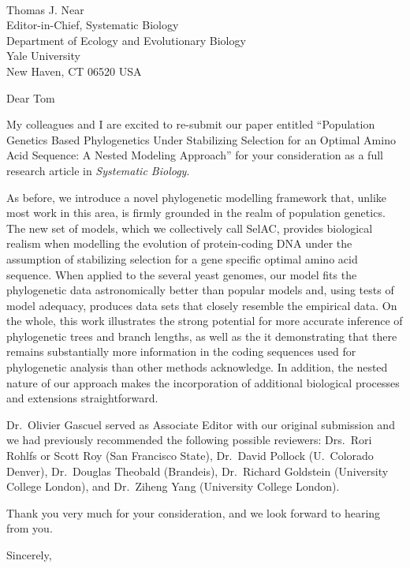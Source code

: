 \documentclass[11pt,letterpaper]{letter}
\begin{document}
\begin{letter}{
\ \\
Thomas J. Near\\
Editor-in-Chief, Systematic Biology\\
Department of Ecology and Evolutionary Biology\\
Yale University\\
New Haven, CT 06520 USA
}


\opening{Dear Tom}

My colleagues and I are excited to re-submit our paper entitled “Population Genetics Based Phylogenetics Under Stabilizing Selection for an Optimal Amino Acid Sequence: A Nested Modeling Approach” for your consideration as a full research article in \emph{Systematic Biology}.

As before, we introduce a novel phylogenetic modelling framework that, unlike most work in this area, is firmly grounded in the realm of population genetics. 
The new set of models, which we collectively call SelAC, provides biological realism when modelling the evolution of protein-coding DNA under the assumption of stabilizing selection for a gene specific optimal amino acid sequence. 
When applied to the several yeast genomes, our model fits the phylogenetic data astronomically better than popular models and, using tests of model adequacy,  produces data sets that closely resemble the empirical data. 
On the whole, this work illustrates the strong potential for more accurate inference of phylogenetic trees and branch lengths, as well as the it demonstrating that there remains substantially more information in the coding sequences used for phylogenetic analysis than other methods acknowledge.
In addition, the nested nature of our approach makes the incorporation of additional biological processes and extensions straightforward. 

Dr.~Olivier Gascuel served as Associate Editor with our original submission and we had previously recommended the following possible reviewers: Drs.~Rori Rohlfs or Scott Roy (San Francisco State), Dr.~David Pollock (U.~Colorado Denver), Dr.~Douglas Theobald (Brandeis), Dr.~Richard Goldstein (University College London), and Dr.~Ziheng Yang (University College London).

Thank you very much for your consideration, and we look forward to hearing from you.


\closing{Sincerely,}
\end{letter}
\end{document}
